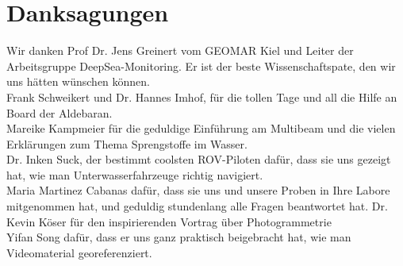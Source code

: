  

\chapter[Danksagungen]{Danksagungen}
Wir danken Prof Dr. Jens Greinert vom GEOMAR Kiel und Leiter der Arbeitsgruppe DeepSea-Monitoring. Er ist der beste Wissenschaftspate, den wir uns hätten wünschen können.\\
Frank Schweikert und Dr. Hannes Imhof, für die tollen Tage und all die Hilfe an Board der Aldebaran. \\
Mareike Kampmeier für die geduldige Einführung am Multibeam und die vielen Erklärungen zum Thema Sprengstoffe im Wasser. \\
Dr. Inken Suck, der bestimmt coolsten ROV-Piloten dafür, dass sie uns gezeigt hat, wie man Unterwasserfahrzeuge richtig navigiert. \\
Maria Martinez Cabanas dafür, dass sie uns und unsere Proben in Ihre Labore mitgenommen hat, und geduldig stundenlang alle Fragen beantwortet hat.
Dr. Kevin Köser für den inspirierenden Vortrag über Photogrammetrie \\
Yifan Song dafür, dass er uns ganz praktisch beigebracht hat, wie man Videomaterial georeferenziert.





